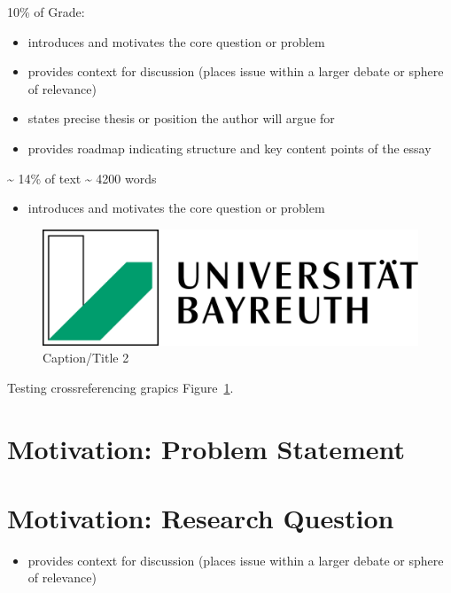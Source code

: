 \documentclass[
  letterpaper,
]{book}
\providecommand{\tightlist}{%
  \setlength{\itemsep}{0pt}\setlength{\parskip}{0pt}}
\begin{document}
10\% of Grade:

\begin{itemize}
\tightlist
\item
  introduces and motivates the core question or problem
\item
  provides context for discussion (places issue within a larger debate
  or sphere of relevance)
\item
  states precise thesis or position the author will argue for
\item
  provides roadmap indicating structure and key content points of the
  essay
\end{itemize}

\textasciitilde{} 14\% of text \textasciitilde{} 4200 words

\begin{itemize}
\tightlist
\item
  introduces and motivates the core question or problem
\end{itemize}

\begin{figure}

\includegraphics[width=0.3\linewidth,height=\textheight,keepaspectratio]{images/cover.png}

\caption[Short 2 caption]{\label{fig-testgraphic2}Caption/Title 2}

\end{figure}%

Testing crossreferencing grapics Figure~\ref{fig-testgraphic2}.

\section{Motivation: Problem
Statement}\label{motivation-problem-statement}

\section{Motivation: Research
Question}\label{motivation-research-question}

\begin{itemize}
\tightlist
\item
  provides context for discussion (places issue within a larger debate
  or sphere of relevance)
\end{itemize}
\end{document}
